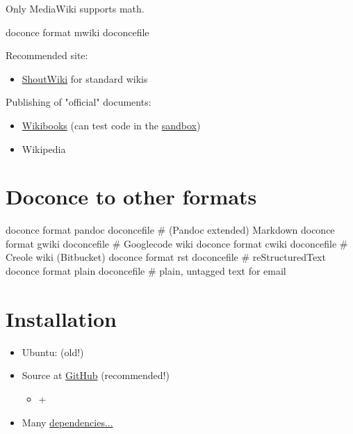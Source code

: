 \documentclass[%
twoside,                 %
draft,                   %
final,                   %
chapterprefix=true,      %
open=right               %
10pt]{book}
\newcounter{doconce:movie:counter}
\newcounter{doconce:exercise:counter}
\begin{document}
\begin{shadedquoteBlue}
Only MediaWiki supports math.

\bccq
doconce format mwiki doconcefile
\eccq


Recommended site:

\begin{itemize}
 \item \href{{http://doconcedemo.shoutwiki.com/wiki/Doconce_demo_page}}{ShoutWiki}
   for standard wikis
\end{itemize}

\noindent
Publishing of "official" documents:

\begin{itemize}
 \item \href{{http://en.wikibooks.org/wiki/Wikibooks:WIW}}{Wikibooks}
   (can test code in the \href{{http://en.wikibooks.org/wiki/Wikibooks:Sandbox}}{sandbox})

 \item Wikipedia
\end{itemize}

\noindent
\section*{Doconce to other formats}

\bccq
doconce format pandoc doconcefile  # (Pandoc extended) Markdown
doconce format gwiki  doconcefile  # Googlecode wiki
doconce format cwiki  doconcefile  # Creole wiki (Bitbucket)
doconce format rst    doconcefile  # reStructuredText
doconce format plain  doconcefile  # plain, untagged text for email
\eccq

\section*{Installation}

\begin{itemize}
 \item Ubuntu:  (old!)

 \item Source at \href{{https://github.com/hplgit/doconce}}{GitHub} (recommended!)
\begin{itemize}

   \item {} + 

\end{itemize}

\noindent
 \item Many \href{{http://hplgit.github.io/doconce/doc/pub/manual/html/manual.html#installation-of-doconce-and-its-dependencies}}{dependencies...}
\begin{itemize}


\end{itemize}
\end{itemize}
\end{shadedquoteBlue}
\end{document}
